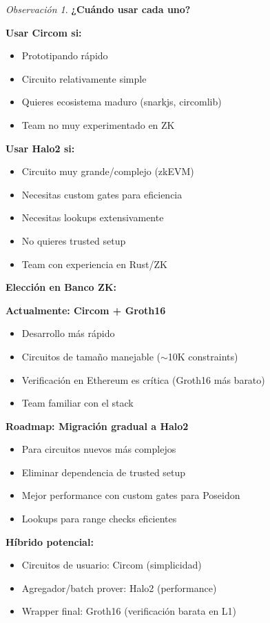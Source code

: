 \documentclass[11pt,a4paper,twoside,openright]{book}
\theoremstyle{definition}
\theoremstyle{plain}
\theoremstyle{remark}
\newtheorem{remark}{Observación}[chapter]
\begin{document}
\begin{remark}
\textbf{¿Cuándo usar cada uno?}

\textbf{Usar Circom si:}
\begin{itemize}
    \item Prototipando rápido
    \item Circuito relativamente simple
    \item Quieres ecosistema maduro (snarkjs, circomlib)
    \item Team no muy experimentado en ZK
\end{itemize}

\textbf{Usar Halo2 si:}
\begin{itemize}
    \item Circuito muy grande/complejo (zkEVM)
    \item Necesitas custom gates para eficiencia
    \item Necesitas lookups extensivamente
    \item No quieres trusted setup
    \item Team con experiencia en Rust/ZK
\end{itemize}
\end{remark}

\begin{bancozk}
\textbf{Elección en Banco ZK:}

\textbf{Actualmente: Circom + Groth16}
\begin{itemize}
    \item Desarrollo más rápido
    \item Circuitos de tamaño manejable ($\sim$10K constraints)
    \item Verificación en Ethereum es crítica (Groth16 más barato)
    \item Team familiar con el stack
\end{itemize}

\textbf{Roadmap: Migración gradual a Halo2}
\begin{itemize}
    \item Para circuitos nuevos más complejos
    \item Eliminar dependencia de trusted setup
    \item Mejor performance con custom gates para Poseidon
    \item Lookups para range checks eficientes
\end{itemize}

\textbf{Híbrido potencial:}
\begin{itemize}
    \item Circuitos de usuario: Circom (simplicidad)
    \item Agregador/batch prover: Halo2 (performance)
    \item Wrapper final: Groth16 (verificación barata en L1)
\end{itemize}
\end{bancozk}
\end{document}
